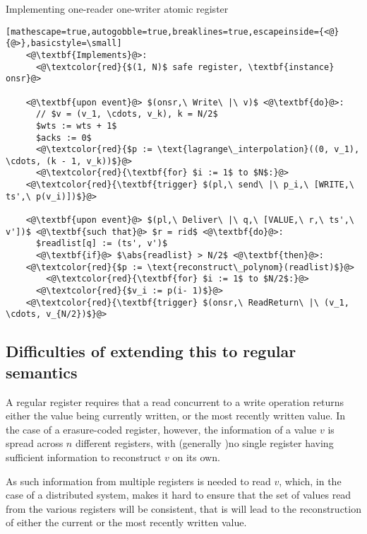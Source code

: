 \documentclass[a4paper]{scrreprt}
\DeclarePairedDelimiter\abs{\lvert}{\rvert}
\begin{document}
\begin{library}{Implementing one-reader one-writer atomic register}
  \begin{lstlisting}[mathescape=true,autogobble=true,breaklines=true,escapeinside={<@}{@>},basicstyle=\small]
    <@\textbf{Implements}@>:
      <@\textcolor{red}{$(1, N)$ safe register, \textbf{instance} onsr}@>

    <@\textbf{upon event}@> $(onsr,\ Write\ |\ v)$ <@\textbf{do}@>:
      // $v = (v_1, \cdots, v_k), k = N/2$
      $wts := wts + 1$
      $acks := 0$
      <@\textcolor{red}{$p := \text{lagrange\_interpolation}((0, v_1), \cdots, (k - 1, v_k))$}@>
      <@\textcolor{red}{\textbf{for} $i := 1$ to $N$:}@>
	<@\textcolor{red}{\textbf{trigger} $(pl,\ send\ |\ p_i,\ [WRITE,\ ts',\ p(v_i)])$}@>

    <@\textbf{upon event}@> $(pl,\ Deliver\ |\ q,\ [VALUE,\ r,\ ts',\ v'])$ <@\textbf{such that}@> $r = rid$ <@\textbf{do}@>:
      $readlist[q] := (ts', v')$
      <@\textbf{if}@> $\abs{readlist} > N/2$ <@\textbf{then}@>:
	<@\textcolor{red}{$p := \text{reconstruct\_polynom}(readlist)$}@>
        <@\textcolor{red}{\textbf{for} $i := 1$ to $N/2$:}@>
	  <@\textcolor{red}{$v_i := p(i- 1)$}@>
	<@\textcolor{red}{\textbf{trigger} $(onsr,\ ReadReturn\ |\ (v_1, \cdots, v_{N/2})$}@>
  \end{lstlisting}
\end{library}

\subsection{Difficulties of extending this to regular semantics}

A regular register requires that a read concurrent to a write operation returns
either the value being currently written, or the most recently written value.
In the case of a erasure-coded register, however, the information of a value
$v$ is spread across $n$ different registers, with (generally )no single
register having sufficient information to reconstruct $v$ on its own.

As such information from multiple registers is needed to read $v$, which, in
the case of a distributed system, makes it hard to ensure that the set of
values read from the various registers will be consistent, that is will lead to
the reconstruction of either the current or the most recently written value.
\end{document}
